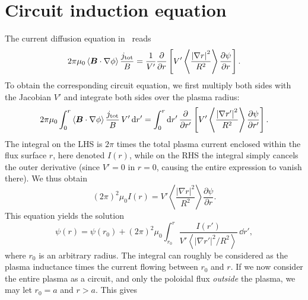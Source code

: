 \documentclass{notes}
\begin{document}
    \printbibliography

    \newpage
    \appendix
    \section{Circuit induction equation}\label{app:induction}
    The current diffusion equation in \DREAM\ reads
    \begin{equation}
        2\pi\mu_0\left\langle\boldsymbol{B}\cdot\nabla\phi\right\rangle
        \frac{j_{\rm tot}}{B} = \frac{1}{V'}\frac{\partial}{\partial r}\left[
            V'\left\langle\frac{\left|\nabla r\right|^2}{R^2}\right\rangle
            \frac{\partial\psi}{\partial r}
        \right].
    \end{equation}
    To obtain the corresponding circuit equation, we first multiply both sides
    with the Jacobian $V'$ and integrate both sides over the plasma radius:
    \begin{equation}
        2\pi\mu_0\int_0^r
            \left\langle\boldsymbol{B}\cdot\nabla\phi\right\rangle
            \frac{j_{\rm tot}}{B}\,V'\,\mathrm{d} r'
        =
        \int_0^r\mathrm{d} r'\,\frac{\partial}{\partial r'}\left[
            V'\left\langle\frac{\left|\nabla r'\right|^2}{R^2}\right\rangle
            \frac{\partial\psi}{\partial r'}
        \right].
    \end{equation}
    The integral on the LHS is $2\pi$ times the total plasma current enclosed
    within the flux surface $r$, here denoted $I(r)$, while on the RHS the
    integral simply cancels the outer derivative (since $V' = 0$ in $r=0$,
    causing the entire expression to vanish there). We thus obtain
    \begin{equation}
        \left(2\pi\right)^2\mu_0 I(r) =
        V'\left\langle\frac{\left|\nabla r\right|^2}{R^2}\right\rangle
        \frac{\partial\psi}{\partial r}.
    \end{equation}
    This equation yields the solution
    \begin{equation}
        \psi(r) = \psi\left(r_0\right) + \left(2\pi\right)^2\mu_0\int_{r_0}^r\frac{I(r')}{V'\left\langle\left|\nabla r'\right|^2/R^2\right\rangle}\,\dd r',
    \end{equation}
    where $r_0$ is an arbitrary radius. The integral can roughly be considered
    as the plasma inductance times the current flowing between $r_0$ and $r$.
    If we now consider the entire plasma as a circuit, and only the poloidal
    flux \emph{outside} the plasma, we may let $r_0 = a$ and $r>a$. This gives
\end{document}
